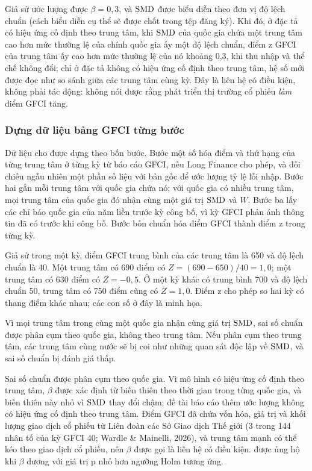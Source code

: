 \begin{vidu}
Giả sử ước lượng được $\beta = 0{,}3$, và $\mathrm{SMD}$ được biểu diễn theo đơn vị độ lệch chuẩn (cách biểu diễn cụ thể sẽ được chốt trong tệp đăng ký). Khi đó, ở đặc tả có hiệu ứng cố định theo trung tâm, khi $\mathrm{SMD}$ của quốc gia chứa một trung tâm cao hơn mức thường lệ của chính quốc gia ấy một độ lệch chuẩn, điểm z GFCI của trung tâm ấy cao hơn mức thường lệ của nó khoảng 0,3, khi thu nhập và thể chế không đổi; chỉ ở đặc tả không có hiệu ứng cố định theo trung tâm, hệ số mới được đọc như so sánh giữa các trung tâm cùng kỳ. Đây là liên hệ có điều kiện, không phải tác động: không nói được rằng phát triển thị trường cổ phiếu \emph{làm} điểm GFCI tăng.
\end{vidu}

\subsubsection*{Dựng dữ liệu bảng GFCI từng bước}

Dữ liệu cho  được dựng theo bốn bước. Bước một số hóa điểm và thứ hạng của từng trung tâm ở từng kỳ từ báo cáo GFCI, nếu Long Finance cho phép, và đối chiếu ngẫu nhiên một phần số liệu với bản gốc để ước lượng tỷ lệ lỗi nhập. Bước hai gắn mỗi trung tâm với quốc gia chứa nó; với quốc gia có nhiều trung tâm, mọi trung tâm của quốc gia đó nhận cùng một giá trị $\mathrm{SMD}$ và $W$. Bước ba lấy các chỉ báo quốc gia của năm liền trước kỳ công bố, vì kỳ GFCI phản ánh thông tin đã có trước khi công bố. Bước bốn chuẩn hóa điểm GFCI thành điểm z trong từng kỳ.

\begin{vidu}
Giả sử trong một kỳ, điểm GFCI trung bình của các trung tâm là 650 và độ lệch chuẩn là 40. Một trung tâm có 690 điểm có $Z = (690 - 650)/40 = 1{,}0$; một trung tâm có 630 điểm có $Z = -0{,}5$. Ở một kỳ khác có trung bình 700 và độ lệch chuẩn 50, trung tâm có 750 điểm cũng có $Z = 1{,}0$. Điểm z cho phép so hai kỳ có thang điểm khác nhau; các con số ở đây là minh họa.
\end{vidu}

Vì mọi trung tâm trong cùng một quốc gia nhận cùng giá trị $\mathrm{SMD}$, sai số chuẩn được phân cụm theo quốc gia, không theo trung tâm. Nếu phân cụm theo trung tâm, các trung tâm cùng nước sẽ bị coi như những quan sát độc lập về $\mathrm{SMD}$, và sai số chuẩn bị đánh giá thấp.


Sai số chuẩn được phân cụm theo quốc gia. Vì mô hình có hiệu ứng cố định theo trung tâm, $\beta$ được xác định từ biến thiên theo thời gian trong từng quốc gia, và biến thiên này nhỏ vì $\mathrm{SMD}$ thay đổi chậm; đề tài báo cáo thêm ước lượng không có hiệu ứng cố định theo trung tâm. Điểm GFCI đã chứa vốn hóa, giá trị và khối lượng giao dịch cổ phiếu từ Liên đoàn các Sở Giao dịch Thế giới (3 trong 144 nhân tố của kỳ GFCI 40; Wardle \& Mainelli, 2026), và trung tâm mạnh có thể kéo theo giao dịch cổ phiếu, nên $\beta$ được gọi là liên hệ có điều kiện.  được ủng hộ khi $\beta$ dương với giá trị p nhỏ hơn ngưỡng Holm tương ứng.

